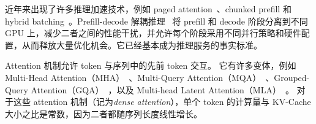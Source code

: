 近年来出现了许多推理加速技术，例如 paged attention~\cite{SOSP23:PagedAttention}、chunked prefill 和 hybrid batching~\cite{OSDI24:SarathiServe,FastGen}。Prefill-decode 解耦推理~\cite{ISCA24:Splitwise,OSDI24:DistServe} 将 prefill 和 decode 阶段分离到不同 GPU 上，减少二者之间的性能干扰，并允许每个阶段采用不同并行策略和硬件配置，从而释放大量优化机会。它已经基本成为推理服务的事实标准。

Attention 机制允许 token 与序列中的先前 token 交互。
它有许多变体，例如 Multi-Head Attention（MHA）~\cite{NIPS17:Transformer}、Multi-Query Attention（MQA）~\cite{MQA}、Grouped-Query Attention（GQA）~\cite{EMNLP23:GQA}，以及 Multi-head Latent Attention（MLA）~\cite{DeepSeekV2}。
对于这些 attention 机制（记为\emph{dense attention}），单个 token 的计算量与 KV-Cache 大小之比是常数，因为二者都随序列长度线性增长。
